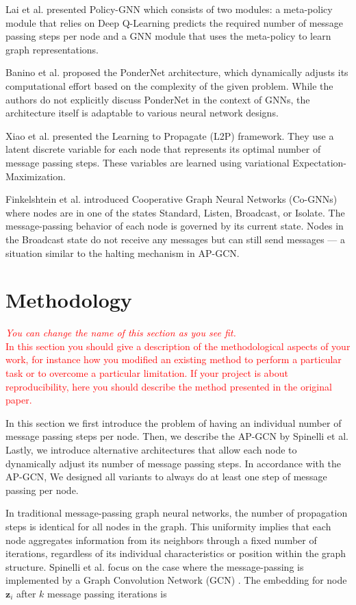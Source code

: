 \documentclass{gdl}
\begin{document}
Lai et al. \cite{lai2020} presented Policy-GNN which consists of two modules: a meta-policy module that relies on Deep Q-Learning predicts the required number of message passing steps per node and a GNN module that uses the meta-policy to learn graph representations.

Banino et al. \cite{banino2021} proposed the PonderNet architecture, which dynamically adjusts its computational effort based on the complexity of the given problem. While the authors do not explicitly discuss PonderNet in the context of GNNs, the architecture itself is adaptable to various neural network designs.

Xiao et al. \cite{xiao2021} presented the Learning to Propagate (L2P) framework. They use a latent discrete variable for each node that represents its optimal number of message passing steps. These variables are learned using variational Expectation-Maximization.

Finkelshtein et al. \cite{finkelshtein2024} introduced Cooperative Graph Neural Networks (Co-GNNs) where nodes are in one of the states Standard, Listen, Broadcast, or Isolate. The message-passing behavior of each node is governed by its current state. Nodes in the Broadcast state do not receive any messages but can still send messages — a situation similar to the halting mechanism in AP-GCN.

\section{Methodology}

\textcolor{red}{
\textit{You can change the name of this section as you see fit.}\\
In this section you should give a description of the methodological aspects of your work, for instance how you modified an existing method to perform a particular task or to overcome a particular limitation. If your project is about reproducibility, here you should describe the method presented in the original paper.}

In this section we first introduce the problem of having an individual number of message passing steps per node. Then, we describe the AP-GCN by Spinelli et al. Lastly, we introduce alternative architectures that allow each node to dynamically adjust its number of message passing steps. In accordance with the AP-GCN, We designed all variants to always do at least one step of message passing per node.

In traditional message-passing graph neural networks, the number of propagation steps is identical for all nodes in the graph. This uniformity implies that each node aggregates information from its neighbors through a fixed number of iterations, regardless of its individual characteristics or position within the graph structure. Spinelli et al. focus on the case where the message-passing is implemented by a Graph Convolution Network (GCN) \cite{kipf2017}. The embedding for node $\mathbf{z}_i$ after $k$ message passing iterations is
\end{document}
